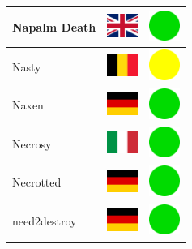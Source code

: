 \documentclass[12pt, a4paper, twoside]{report}
\begin{document}
\begin{center}
\begin{longtable}{|p{5cm}|p{2cm}|p{2cm}|}
 Napalm Death                                               & \includegraphics[width=1cm]{4x3/gb} &   \includegraphics[width=1cm]{likes/y} \\ \hline
 Nasty                                                      & \includegraphics[width=1cm]{4x3/be} &   \includegraphics[width=1cm]{likes/m} \\ \hline
 Naxen                                                      & \includegraphics[width=1cm]{4x3/de} &   \includegraphics[width=1cm]{likes/y} \\ \hline
 Necrosy                                                    & \includegraphics[width=1cm]{4x3/it} &   \includegraphics[width=1cm]{likes/y} \\ \hline
 Necrotted                                                  & \includegraphics[width=1cm]{4x3/de} &   \includegraphics[width=1cm]{likes/y} \\ \hline
 need2destroy                                               & \includegraphics[width=1cm]{4x3/de} &   \includegraphics[width=1cm]{likes/y} \\ \hline

\end{longtable}
\end{center}
\end{document}
